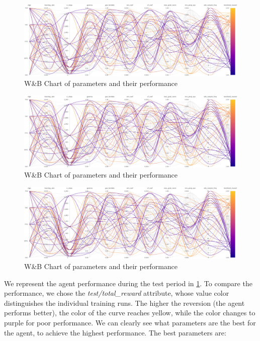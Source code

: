 \documentclass[../xlapes02]{subfiles}
\begin{document}
    \begin{figure}
        \centering
        \includegraphics[width=\linewidth, height=0.2\paperheight]{image/figure/wb1}
        \caption{W\&B Chart of parameters and their performance}
        \label{fig:wb-chart1}
    \end{figure}
    \begin{figure}
        \centering
        \includegraphics[width=\linewidth, height=0.2\paperheight]{image/figure/wb1}
        \caption{W\&B Chart of parameters and their performance}
        \label{fig:wb-chart2}
    \end{figure}
    \begin{figure}
        \centering
        \includegraphics[width=\linewidth, height=0.2\paperheight]{image/figure/wb1}
        \caption{W\&B Chart of parameters and their performance}
        \label{fig:wb-chart3}
    \end{figure}

    We represent the agent performance during the test period in \cref{fig:wb-chart1}. To compare the performance, we chose the \emph{test/total\_reward} attribute, whose value color distinguishes the individual training runs. The higher the reversion (the agent performs better), the color of the curve reaches yellow, while the color changes to purple for poor performance. We can clearly see what parameters are the best for the agent, to achieve the highest performance. The best parameters are:
\end{document}

